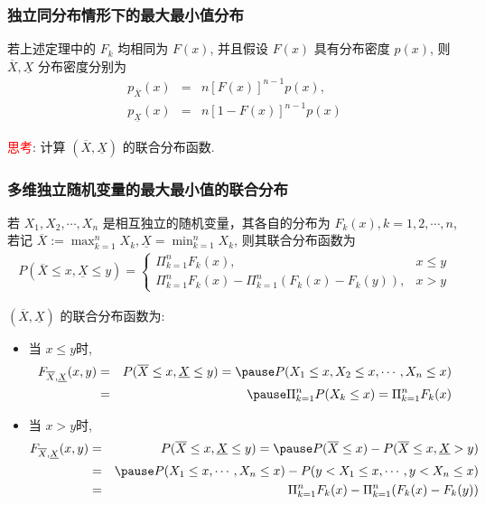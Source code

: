 \documentclass[Prob-All.tex]{subfiles}
\begin{document}
 \begin{frame}
 	\frametitle{独立同分布情形下的最大最小值分布}
 	\begin{coro}
 		若上述定理中的 $F_k$ 均相同为 $F (x)$, 并且假设 $F (x)$ 具有分布密度 $p (x)$, 则 $\overline{X},\underline{X}$ 分布密度分别为
 		\begin{eqnarray*}
 			p_{\overline{X}}(x)&=&n[F(x)]^{n-1}p(x),\\
 			p_{\underline{X}}(x)&=&n[1-F(x)]^{n-1}p(x)
 		\end{eqnarray*}
 	\end{coro}

 	\pause

 	\textcolor{red}{思考}: 计算 $(\overline{X},\underline{X})$ 的联合分布函数.

 \end{frame}

\begin{frame}
 	\frametitle{多维独立随机变量的最大最小值的联合分布}
 	\begin{thm}
 		若 $X_1,X_2,\cdots,X_n$ 是相互独立的随机变量，其各自的分布为 $F_k (x), k=1,2,
 		\cdots, n$, 若记 $
 			\overline{X}:=\max_{k=1}^nX_k, \underline{X}=\min_{k=1}^nX_k$, 则其联合分布函数为
 		\begin{eqnarray*}
 			P(\overline{X}\le x, \underline{X}\le y)=\left\{\begin{array}{ll}
			  \Pi_{k=1}^nF_k(x),& x\leq y\\
			  \Pi_{k=1}^nF_k(x)-\Pi_{k=1}^n(F_k(x)-F_k(y)),& x>y
			\end{array}\right.
 		\end{eqnarray*}
 	\end{thm}
 	\pause \zheng $(\overline{X},\underline{X})$ 的联合分布函数为:
	\begin{itemize}[<+-|alert@+>]
	\item 当 $x\leq y$时,
	\begin{eqnarray*}
 		F_{\overline{X}, \underline{X}}(x,y)&=&P(\overline{X}\le x, \underline{X}\le y)=\pause P(X_1\le x,X_2\le x,\cdots, X_n\le x)\\
 		&=&\pause  \Pi_{k=1}^nP(X_k\le x)=\Pi_{k=1}^nF_k(x)
 	\end{eqnarray*}
	\item 当 $x>y$时,
\begin{eqnarray*}
 		F_{\overline{X}, \underline{X}}(x,y)&=&P(\overline{X}\le x, \underline{X}\le y)=\pause P(\overline{X}\le x)-P(\overline{X}\le x, \underline{X}>y)\\
 		&=&\pause P(X_1\le x,\cdots, X_n\le x)-P(y<X_1\le x,\cdots, y<X_n\le x)\\
 		&=&\Pi_{k=1}^nF_k(x)-\Pi_{k=1}^n(F_k(x)-F_k(y))
 	\end{eqnarray*}
	\end{itemize}



 \end{frame}
\end{document}
